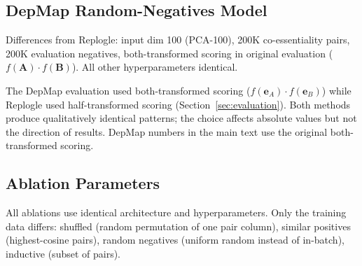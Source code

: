 \documentclass[11pt]{article}
\begin{document}
\subsection{DepMap Random-Negatives Model}

Differences from Replogle: input dim 100 (PCA-100), 200K co-essentiality pairs, 200K evaluation negatives, both-transformed scoring in original evaluation ($f(\mathbf{A}) \cdot f(\mathbf{B})$). All other hyperparameters identical.

The DepMap evaluation used both-transformed scoring ($f(\mathbf{e}_A) \cdot f(\mathbf{e}_B)$) while Replogle used half-transformed scoring (Section~\ref{sec:evaluation}). Both methods produce qualitatively identical patterns; the choice affects absolute values but not the direction of results. DepMap numbers in the main text use the original both-transformed scoring.

\subsection{Ablation Parameters}

All ablations use identical architecture and hyperparameters. Only the training data differs: shuffled (random permutation of one pair column), similar positives (highest-cosine pairs), random negatives (uniform random instead of in-batch), inductive (subset of pairs).



\end{document}
